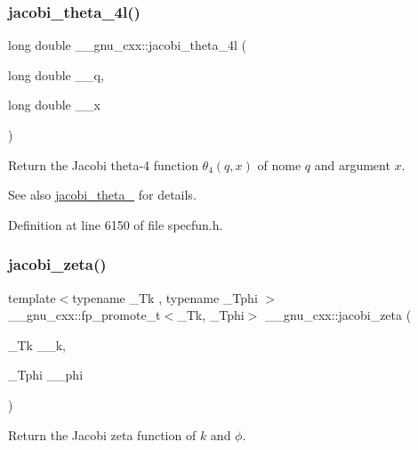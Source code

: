 \subsubsection{\texorpdfstring{jacobi\+\_\+theta\+\_\+4l()}{jacobi\_theta\_4l()}}
{\footnotesize\ttfamily long double \+\_\+\+\_\+gnu\+\_\+cxx\+::jacobi\+\_\+theta\+\_\+4l (\begin{DoxyParamCaption}\item[{long double}]{\+\_\+\+\_\+q,  }\item[{long double}]{\+\_\+\+\_\+x }\end{DoxyParamCaption})\hspace{0.3cm}{\ttfamily [inline]}}

Return the Jacobi theta-\/4 function $ \theta_4(q,x) $ of nome $ q $ and argument $ x $.

\begin{DoxySeeAlso}{See also}
\hyperlink{group__gnu__math__spec__func_ga676501b6284d5702a3dc61252e6c78ab}{jacobi\+\_\+theta\+\_} for details. 
\end{DoxySeeAlso}


Definition at line 6150 of file specfun.\+h.

\mbox{\label{group__gnu__math__spec__func_ga639be4ebef9a20572375ec534be52b07}} 
\subsubsection{\texorpdfstring{jacobi\+\_\+zeta()}{jacobi\_zeta()}}
{\footnotesize\ttfamily template$<$typename \+\_\+\+Tk , typename \+\_\+\+Tphi $>$ \\
\+\_\+\+\_\+gnu\+\_\+cxx\+::fp\+\_\+promote\+\_\+t$<$\+\_\+\+Tk, \+\_\+\+Tphi$>$ \+\_\+\+\_\+gnu\+\_\+cxx\+::jacobi\+\_\+zeta (\begin{DoxyParamCaption}\item[{\+\_\+\+Tk}]{\+\_\+\+\_\+k,  }\item[{\+\_\+\+Tphi}]{\+\_\+\+\_\+phi }\end{DoxyParamCaption})\hspace{0.3cm}{\ttfamily [inline]}}

Return the Jacobi zeta function of $ k $ and $ \phi $.

